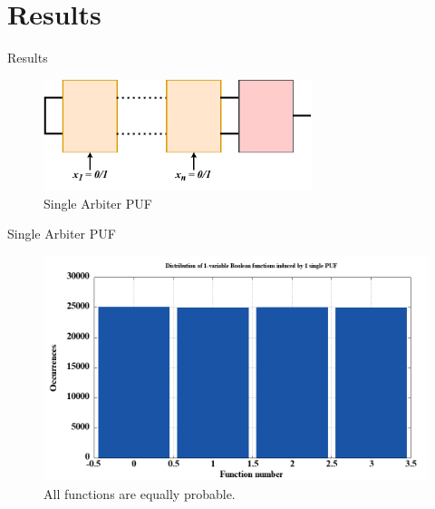 \documentclass[10pt, compress]{beamer}
\begin{document}
\section{Results}


\begin{frame}{Results}
    \begin{figure}
        \centering
        \includegraphics[width=0.7\textwidth]{figures/puf_1.pdf}
        \caption{Single Arbiter PUF}
    \end{figure}
\end{frame}

\begin{frame}{Single Arbiter PUF}
    \begin{figure}
        \centering
        \includegraphics[width=\textwidth]{figures/dist/distribution_of_1-variable_boolean_functions_induced_by_1_single_puf.png}
        \caption{All functions are equally probable.}
    \end{figure}
\end{frame}
\end{document}
